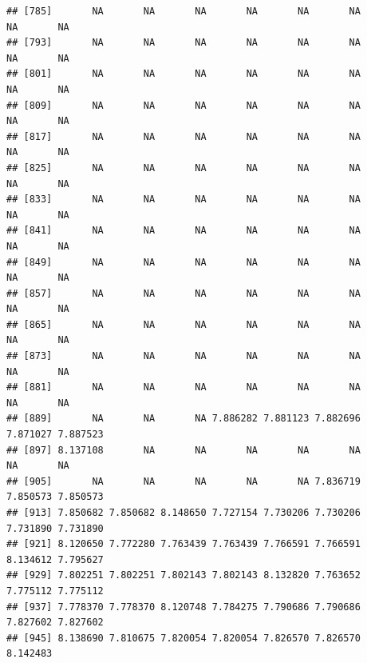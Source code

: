 \documentclass[
]{article}
\newenvironment{Shaded}{\begin{snugshade}}{\end{snugshade}}
\newcommand{\CommentTok}[1]{\textcolor[rgb]{0.56,0.35,0.01}{\textit{#1}}}
\newcommand{\FunctionTok}[1]{\textcolor[rgb]{0.00,0.00,0.00}{#1}}
\newcommand{\NormalTok}[1]{#1}
\newcommand{\OtherTok}[1]{\textcolor[rgb]{0.56,0.35,0.01}{#1}}
\newcommand{\SpecialCharTok}[1]{\textcolor[rgb]{0.00,0.00,0.00}{#1}}
\begin{document}
\begin{verbatim}
## [785]       NA       NA       NA       NA       NA       NA       NA       NA
## [793]       NA       NA       NA       NA       NA       NA       NA       NA
## [801]       NA       NA       NA       NA       NA       NA       NA       NA
## [809]       NA       NA       NA       NA       NA       NA       NA       NA
## [817]       NA       NA       NA       NA       NA       NA       NA       NA
## [825]       NA       NA       NA       NA       NA       NA       NA       NA
## [833]       NA       NA       NA       NA       NA       NA       NA       NA
## [841]       NA       NA       NA       NA       NA       NA       NA       NA
## [849]       NA       NA       NA       NA       NA       NA       NA       NA
## [857]       NA       NA       NA       NA       NA       NA       NA       NA
## [865]       NA       NA       NA       NA       NA       NA       NA       NA
## [873]       NA       NA       NA       NA       NA       NA       NA       NA
## [881]       NA       NA       NA       NA       NA       NA       NA       NA
## [889]       NA       NA       NA 7.886282 7.881123 7.882696 7.871027 7.887523
## [897] 8.137108       NA       NA       NA       NA       NA       NA       NA
## [905]       NA       NA       NA       NA       NA 7.836719 7.850573 7.850573
## [913] 7.850682 7.850682 8.148650 7.727154 7.730206 7.730206 7.731890 7.731890
## [921] 8.120650 7.772280 7.763439 7.763439 7.766591 7.766591 8.134612 7.795627
## [929] 7.802251 7.802251 7.802143 7.802143 8.132820 7.763652 7.775112 7.775112
## [937] 7.778370 7.778370 8.120748 7.784275 7.790686 7.790686 7.827602 7.827602
## [945] 8.138690 7.810675 7.820054 7.820054 7.826570 7.826570 8.142483
\end{verbatim}

\begin{Shaded}
\end{Shaded}
\end{document}
